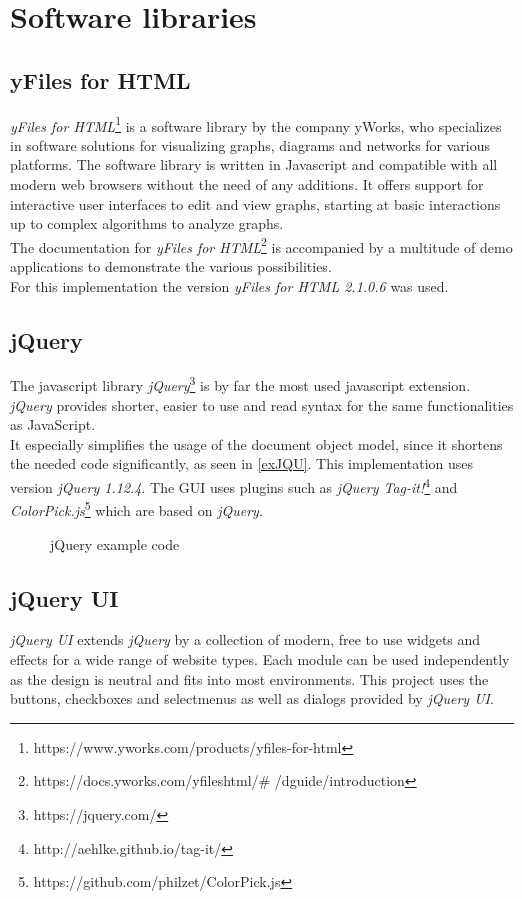 \section{Software libraries}
\subsection{yFiles for HTML}
\textit{yFiles for HTML}\footnote{https://www.yworks.com/products/yfiles-for-html} is a software library by the company yWorks, who specializes in software solutions for visualizing graphs, diagrams and networks for various platforms.
The software library is written in Javascript and compatible with all modern web browsers without the need of any additions. It offers support for interactive user interfaces to edit and view graphs, starting at basic interactions up to complex algorithms to analyze graphs.\\
The documentation for \textit{yFiles for HTML}\footnote{https://docs.yworks.com/yfileshtml/\# /dguide/introduction} is accompanied by a multitude of demo applications to demonstrate the various possibilities.\\
For this implementation the version \textit{yFiles for HTML 2.1.0.6} was used.
\subsection{jQuery}
The javascript library \textit{jQuery}\footnote{https://jquery.com/} is by far the most used javascript extension. \textit{jQuery} provides shorter, easier to use and read syntax for the same functionalities as JavaScript.\\
It especially simplifies the usage of the document object model, since it shortens the needed code significantly, as seen in \autoref{exJQU}.
This implementation uses version \textit{jQuery 1.12.4}. The GUI uses plugins such as \textit{jQuery Tag-it!}\footnote{http://aehlke.github.io/tag-it/} and \textit{ColorPick.js}\footnote{https://github.com/philzet/ColorPick.js} which are based on \textit{jQuery}.
\begin{figure}[!h]

\caption{jQuery example code}
\label{exJQU}
\end{figure}
\subsection{jQuery UI}
\textit{jQuery UI} extends \textit{jQuery} by a collection of modern, free to use widgets and effects for a wide range of website types. Each module can be used independently as the design is neutral and fits into most environments. This project uses the buttons, checkboxes and selectmenus as well as dialogs provided by \textit{jQuery UI}.

\clearpage
